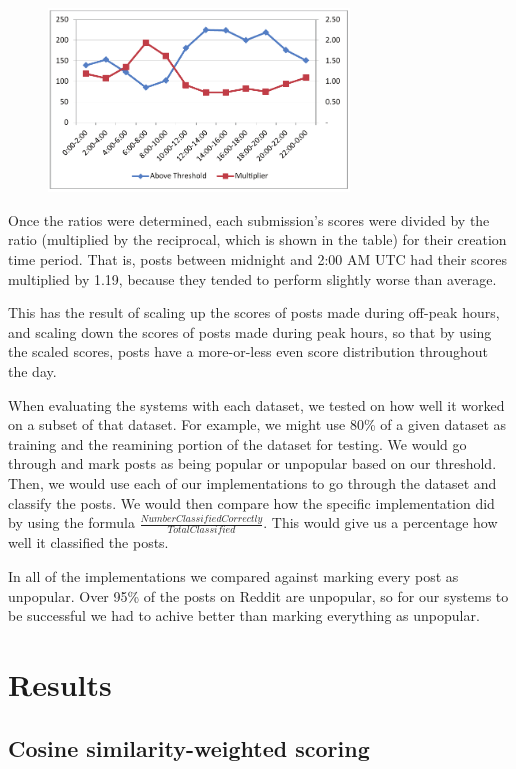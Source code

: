 \documentclass{acm_proc_article-sp}
\begin{document}
\begin{figure}[h!]
\includegraphics[width=8cm]{timeweightinggraph.pdf}
\end{figure}

Once the ratios were determined, each submission's scores were divided by the ratio (multiplied by the reciprocal, which is shown in the
table) for their creation time period.  That is, posts between midnight and 2:00 AM UTC had their scores multiplied by 1.19, because they
tended to perform slightly worse than average.

This has the result of scaling up the scores of posts made during off-peak hours, and scaling down the scores of posts made during peak
hours, so that by using the scaled scores, posts have a more-or-less even score distribution throughout the day.

When evaluating the systems with each dataset, we tested on how well it worked on a subset of that dataset. For example, we might use 80\% of a given dataset as training and the reamining portion of the dataset for testing. We would go through and mark posts as being popular or unpopular based on our threshold. Then, we would use each of our implementations to go through the dataset and classify the posts. We would then compare how the specific implementation did by using the formula $\frac{Number Classified Correctly}{Total Classified}$. This would give us a percentage how well it classified the posts.

In all of the implementations we compared against marking every post as unpopular. Over 95\% of the posts on Reddit are unpopular, so for our systems to be successful we had to achive better than marking everything as unpopular. 

\section{Results}

\subsection{Cosine similarity-weighted scoring}
\end{document}
